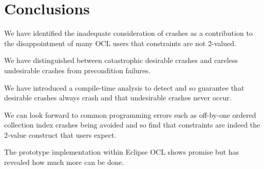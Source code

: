 \documentclass[
]{ceurart}
\begin{document}





\section{Conclusions}\label{Conclusions}

We have identified the inadequate consideration of crashes as a contribution to the disappointment of many OCL users that constraints are not 2-valued.

We have distinguished between catastrophic desirable crashes and careless undesirable crashes from precondition failures.

We have introduced a compile-time analysis to detect and so guarantee that desirable crashes always crash and that undesirable crashes never occur.

We can look forward to common programming errors such as off-by-one ordered collection index crashes being avoided and so find that constraints are indeed the 2-value construct that users expect.

The prototype implementation within Eclipse OCL shows promise but has revealed how much more can be done.
\end{document}
